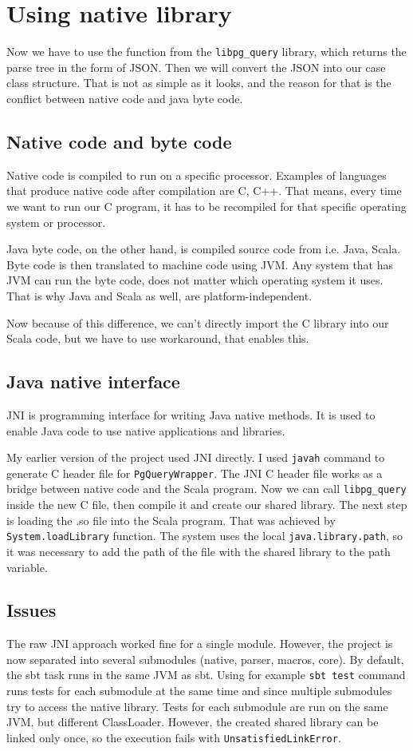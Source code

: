 \section{Using native library}
Now we have to use the function from the \texttt{libpg\_query} library, which returns the parse tree in the form of JSON. Then we will convert the JSON into our case class structure. That is not as simple as it looks, and the reason for that is the conflict between native code and java byte code. 

\subsection{Native code and byte code}
Native code is compiled to run on a specific processor. Examples of languages that produce native code after compilation are C, C++. That means, every time we want to run our C program, it has to be recompiled for that specific operating system or processor.

Java byte code, on the other hand, is compiled source code from i.e. Java, Scala. Byte code is then translated to machine code using JVM. Any system that has JVM can run the byte code, does not matter which operating system it uses. That is why Java and Scala as well, are platform-independent.

Now because of this difference, we can't directly import the C library into our Scala code, but we have to use workaround, that enables this.

\subsection{Java native interface}
JNI is programming interface for writing Java native methods.\cite{JNI} It is used to enable Java code to use native applications and libraries. 

My earlier version of the project used JNI directly. I used \texttt{javah} command to generate C header file for \texttt{PgQueryWrapper}. The JNI C header file works as a bridge between native code and the Scala program. Now we can call \texttt{libpg\_query} inside the new C file, then compile it and create our shared library. The next step is loading the .so file into the Scala program. That was achieved by \texttt{System.loadLibrary} function. The system uses the local \texttt{java.library.path}, so it was necessary to add the path of the file with the shared library to the path variable.

\subsection{Issues}
The raw JNI approach worked fine for a single module. However, the project is now separated into several submodules (native, parser, macros, core). By default, the sbt task runs in the same JVM as sbt.\cite{sbt fork} Using for example \texttt{sbt test} command runs tests for each submodule at the same time and since multiple submodules try to access the native library. Tests for each submodule are run on the same JVM, but different ClassLoader. However, the created shared library can be linked only once, so the execution fails with \texttt{UnsatisfiedLinkError}. 

